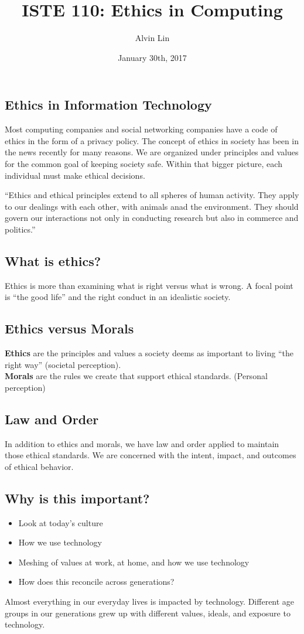 \documentclass{article}
\title{ISTE 110: Ethics in Computing}
\author{Alvin Lin}
\date{January 30th, 2017}
\begin{document}
\maketitle

\subsection*{Ethics in Information Technology}
Most computing companies and social networking companies have a code of ethics
in the form of a privacy policy. The concept of ethics in society has been
in the news recently for many reasons. We are organized under principles and
values for the common goal of keeping society safe. Within that bigger picture,
each individual must make ethical decisions. \par
``Ethics and ethical principles extend to all spheres of human activity. They
apply to our dealings with each other, with animals anad the environment. They
should govern our interactions not only in conducting research but also in
commerce and politics.''

\subsection*{What is ethics?}
Ethics is more than examining what is right versus what is wrong. A focal point
is ``the good life'' and the right conduct in an idealistic society.

\subsection*{Ethics versus Morals}
\textbf{Ethics} are the principles and values a society deems as important to
living ``the right way'' (societal perception). \\
\textbf{Morals} are the rules we create that support ethical standards.
(Personal perception)

\subsection*{Law and Order}
In addition to ethics and morals, we have law and order applied to maintain
those ethical standards. We are concerned with the intent, impact, and outcomes
of ethical behavior.

\subsection*{Why is this important?}
\begin{itemize}
  \item Look at today's culture
  \item How we use technology
  \item Meshing of values at work, at home, and how we use technology
  \item How does this reconcile across generations?
\end{itemize}
Almost everything in our everyday lives is impacted by technology. Different
age groups in our generations grew up with different values, ideals, and
exposure to technology.
\end{document}
